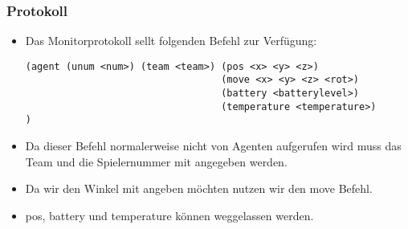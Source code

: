 \frame
{
	\frametitle{Protokoll}
	\begin{itemize}
		\item Das Monitorprotokoll sellt folgenden Befehl zur Verfügung:

		\lstinline |(agent (unum <num>) (team <team>) (pos <x> <y> <z>)|\\
		\lstinline |                                  (move <x> <y> <z> <rot>)|\\
		\lstinline |                                  (battery <batterylevel>)|\\
		\lstinline |                                  (temperature <temperature>)|\\
		\lstinline |)|\\

		\item Da dieser Befehl normalerweise nicht von Agenten aufgerufen wird muss das Team und die Spielernummer mit angegeben werden.
		\item Da wir den Winkel mit angeben möchten nutzen wir den move Befehl.
		\item pos, battery und temperature können weggelassen werden.
	\end{itemize}
}
